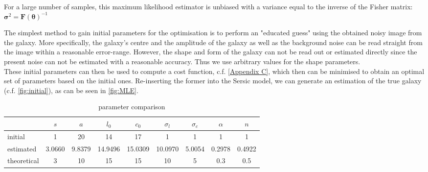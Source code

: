 For a large number of samples, this maximum likelihood estimator is unbiased with a variance equal to the inverse of the Fisher matrix: $\boldsymbol{\sigma}^{2}=\boldsymbol{F}(\boldsymbol{\theta})^{-1}$


The simplest method to gain initial parameters for the optimisation is to perform an "educated guess" using the obtained noisy image from the galaxy. More specifically, the galaxy's centre and the amplitude of the galaxy as well as the background noise can be read straight from the image within a reasonable error-range. However, the shape and form of the galaxy can not be read out or estimated directly since the present noise can not be estimated with a reasonable accuracy. Thus we use arbitrary values for the shape parameters.\\
These initial parameters can then be used to compute a cost function, c.f. \cref{Appendix C}, which then can be minimised to obtain an optimal set of parameters based on the initial ones. Re-inserting the former into the Sersic model, we can generate an estimation of the true galaxy (c.f. \cref{fig:initial}), as can be seen in \cref{fig:MLE}.


\begin{table}[h!]
\centering
\begin{tabular}{ l | c c c c c c c c}
	& $s$ & $a$ & $l_0$ & $c_0$ & $\sigma_l$ & $\sigma_c$ & $\alpha$ & $n$ \\
	\hline
	initial & 1 & 20 & 14 & 17 & 1 & 1 & 1 & 1 \\
	estimated & 3.0660 & 9.8379 & 14.9496 & 15.0309 & 10.0970 & 5.0054 & 0.2978 & 0.4922 \\
	theoretical & 3 & 10 & 15 & 15 & 10 & 5 & 0.3 & 0.5
\end{tabular}
\caption{parameter comparison}
\label{tab:param}
\end{table}

